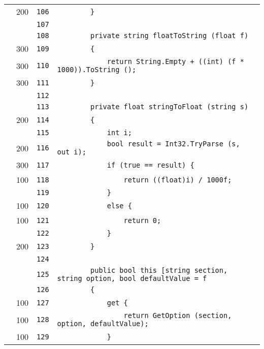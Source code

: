 \documentclass[a4paper,10pt]{article}
\begin{document}
\begin{longtable}[l]{lrrl}
\cellcolor{green} & 200 & \verb~106~ & \verb~        }~\\
\cellcolor{gray} &  & \verb~107~ & \verb~~\\
\cellcolor{gray} &  & \verb~108~ & \verb~        private string floatToString (float f)~\\
\cellcolor{green} & 300 & \verb~109~ & \verb~        {~\\
\cellcolor{green} & 300 & \verb~110~ & \verb~            return String.Empty + ((int) (f * 1000)).ToString ();~\\
\cellcolor{green} & 300 & \verb~111~ & \verb~        }~\\
\cellcolor{gray} &  & \verb~112~ & \verb~~\\
\cellcolor{gray} &  & \verb~113~ & \verb~        private float stringToFloat (string s)~\\
\cellcolor{green} & 200 & \verb~114~ & \verb~        {~\\
\cellcolor{gray} &  & \verb~115~ & \verb~            int i;~\\
\cellcolor{green} & 200 & \verb~116~ & \verb~            bool result = Int32.TryParse (s, out i);~\\
\cellcolor{green} & 300 & \verb~117~ & \verb~            if (true == result) {~\\
\cellcolor{green} & 100 & \verb~118~ & \verb~                return ((float)i) / 1000f;~\\
\cellcolor{gray} &  & \verb~119~ & \verb~            }~\\
\cellcolor{green} & 100 & \verb~120~ & \verb~            else {~\\
\cellcolor{green} & 100 & \verb~121~ & \verb~                return 0;~\\
\cellcolor{gray} &  & \verb~122~ & \verb~            }~\\
\cellcolor{green} & 200 & \verb~123~ & \verb~        }~\\
\cellcolor{gray} &  & \verb~124~ & \verb~~\\
\cellcolor{gray} &  & \verb~125~ & \verb~        public bool this [string section, string option, bool defaultValue = f~\\
\cellcolor{gray} &  & \verb~126~ & \verb~        {~\\
\cellcolor{green} & 100 & \verb~127~ & \verb~            get {~\\
\cellcolor{green} & 100 & \verb~128~ & \verb~                return GetOption (section, option, defaultValue);~\\
\cellcolor{green} & 100 & \verb~129~ & \verb~            }~\\

\end{longtable}
\end{document}
